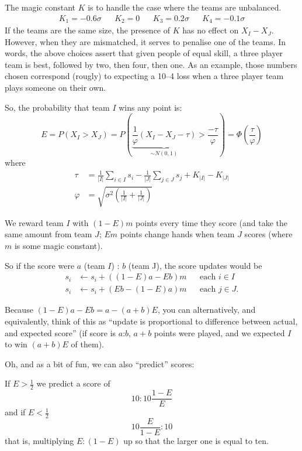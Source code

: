 \documentclass{article}
\begin{document}
The magic constant $K$ is to handle the case where the teams are unbalanced.
\begin{align*}
    K_1 = -0.6\sigma &&
    K_2 =  0 &&
    K_3 =  0.2\sigma &&
    K_4 = -0.1\sigma
\end{align*}
If the teams are the same size, the presence of $K$ has no effect on $X_I - X_J$. However, when they are mismatched, it serves to penalise one of the teams.
In words, the above choices assert that given people of equal skill, a three player team is best, followed by two, then four, then one. As an example, those numbers chosen correspond (rougly) to expecting a 10--4 loss when a three player team plays someone on their own.

So, the probability that team $I$ wins any point is:
\[
    E = P( X_I > X_J ) = P\left( \underbrace{ \frac{1}{\varphi} ( X_I - X_J - \tau ) }_{\sim N(0, 1)}
                                 > \frac{-\tau}{\varphi} \right)
                       = \Phi\left( \frac{\tau}{\varphi} \right)
\]
where
\begin{align*}
    \tau &= \frac{1}{|I|} \sum_{i \in I} s_i - \frac{1}{|J|} \sum_{j \in J} s_j + K_{|I|} - K_{|J|} \\
    \varphi &= \sqrt{ \sigma^2 \left( \frac{1}{|I|} + \frac{1}{|J|} \right) }
\end{align*}

We reward team $I$ with $(1 - E)m$ points every time they score (and take the same amount from team $J$; $Em$ points change hands when team $J$ scores (where $m$ is some magic constant).

So if the score were $a$ (team $I$) : $b$ (team J), the score updates would be
\begin{align*}
    s_i &\leftarrow s_i + ((1-E)a - Eb)m && \text{each } i \in I \\
    s_i &\leftarrow s_i + (Eb - (1-E)a)m && \text{each } j \in J
    \text{.}
\end{align*}

Because $(1-E)a - Eb = a - (a + b)E$, you can alternatively, and equivalently, think of this as ``update is proportional to difference between actual, and expected score'' (if score is $a$:$b$, $a + b$ points were played, and we expected $I$ to win $(a+b)E$ of them).

Oh, and as a bit of fun, we can also ``predict'' scores:

If $E > \frac{1}{2}$ we predict a score of
\[
    10 : 10 \frac{1 - E}{E}
\]
and if $E < \frac{1}{2}$
\[
    10 \frac{E}{1 - E} : 10
\]
that is, multiplying $E : (1 - E)$ up so that the larger one is equal to ten.
\end{document}
